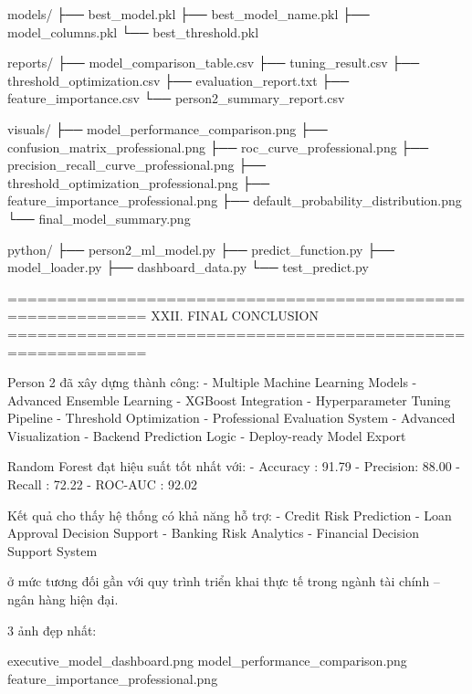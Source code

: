 models/
├── best_model.pkl
├── best_model_name.pkl
├── model_columns.pkl
└── best_threshold.pkl

reports/
├── model_comparison_table.csv
├── tuning_result.csv
├── threshold_optimization.csv
├── evaluation_report.txt
├── feature_importance.csv
└── person2_summary_report.csv

visuals/
├── model_performance_comparison.png
├── confusion_matrix_professional.png
├── roc_curve_professional.png
├── precision_recall_curve_professional.png
├── threshold_optimization_professional.png
├── feature_importance_professional.png
├── default_probability_distribution.png
└── final_model_summary.png

python/
├── person2_ml_model.py
├── predict_function.py
├── model_loader.py
├── dashboard_data.py
└── test_predict.py

============================================================
XXII. FINAL CONCLUSION
============================================================

Person 2 đã xây dựng thành công:
- Multiple Machine Learning Models
- Advanced Ensemble Learning
- XGBoost Integration
- Hyperparameter Tuning Pipeline
- Threshold Optimization
- Professional Evaluation System
- Advanced Visualization
- Backend Prediction Logic
- Deploy-ready Model Export

Random Forest đạt hiệu suất tốt nhất với:
- Accuracy : 91.79%
- Precision: 88.00%
- Recall   : 72.22%
- ROC-AUC : 92.02%

Kết quả cho thấy hệ thống có khả năng hỗ trợ:
- Credit Risk Prediction
- Loan Approval Decision Support
- Banking Risk Analytics
- Financial Decision Support System

ở mức tương đối gần với quy trình triển khai thực tế trong ngành tài chính – ngân hàng hiện đại.

3 ảnh đẹp nhất:

executive_model_dashboard.png
model_performance_comparison.png
feature_importance_professional.png